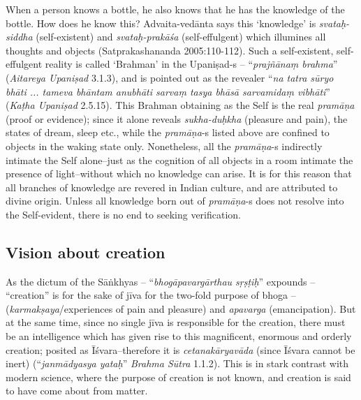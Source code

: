 When a person knows a bottle, he also knows that he has the knowledge of the bottle. How does he know this? Advaita-vedānta says this `knowledge' is {\sl svataḥ-siddha} (self-existent) and {\sl svataḥ-prakāśa} (self-effulgent) which illumines all thoughts and objects (Satprakashananda 2005:110-112). Such a self-existent, self-effulgent reality is called `Brahman' in the Upaniṣad-s -- ``{\sl prajñānaṃ brahma}'' ({\sl Aitareya Upaniṣad} 3.1.3), and is pointed out as the revealer ``{\sl na tatra sūryo bhāti ... tameva bhāntam anubhāti sarvaṃ tasya bhāsā sarvamidaṃ vibhāti}'' ({\sl Kaṭha Upaniṣad} 2.5.15). This Brahman obtaining as the Self is the real {\sl pramāṇa} (proof or evidence); since it alone reveals {\sl sukha-duḥkha} (pleasure and pain), the states of dream, sleep etc., while the {\sl pramāṇa}-s listed above are conﬁned to objects in the waking state only. Nonetheless, all the {\sl pramāṇa}-s indirectly intimate the Self alone--just as the cognition of all objects in a room intimate the presence of light--without which no knowledge can arise. It is for this reason that all branches of knowledge are revered in Indian culture, and are attributed to divine origin. Unless all knowledge born out of {\sl pra\-mā\-ṇa}-s does not resolve into the Self-evident, there is no end to seeking veriﬁcation.

\subsection{Vision about creation}\label{art12-sec2.3}

As the dictum of the Sāṅkhyas -- ``{\sl bhogāpavargārthau sṛṣṭiḥ}'' expounds -- ``creation'' is for the sake of jīva for the two-fold purpose of bhoga -- ({\sl karmakṣaya}/experiences of pain and pleasure) and {\sl apavarga} (emancipation). But at the same time, since no single jīva is responsible for the creation, there must be an intelligence which has given rise to this magniﬁcent, enormous and orderly creation; posited as Īśvara--therefore it is {\sl cetanakāryavāda} (since Īśvara cannot be inert) (``{\sl janmādyasya yataḥ}'' {\sl Brahma Sūtra} 1.1.2). This is in stark contrast with modern science, where the purpose of creation is not known, and creation is said to have come about from matter. 

